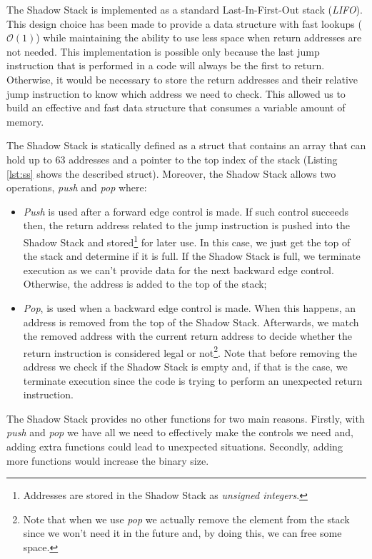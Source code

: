 The Shadow Stack is implemented as a standard Last-In-First-Out stack (\textit{LIFO}).
This design choice has been made to provide a data structure with fast lookups ($\mathcal{O}
(1)$) while maintaining the ability to use less space when return addresses are
not needed. This implementation is possible only because the last jump instruction
that is performed in a code will always be the first to return. Otherwise, it would
be necessary to store the return addresses and their relative jump instruction to
know which address we need to check. This allowed us to build an effective and
fast data structure that consumes a variable amount of memory.

The Shadow Stack is statically defined as a struct that contains an array that
can hold up to $63$ addresses and a pointer to the top index of the stack (Listing
\ref{lst:ss} shows the described struct). Moreover, the Shadow Stack allows two
operations, \textit{push} and \textit{pop} where:
\begin{itemize}
  \item \textit{Push} is used after a forward edge control is made. If such control
    succeeds then, the return address related to the jump instruction is pushed
    into the Shadow Stack and stored\footnote{Addresses are stored in the Shadow
    Stack as \textit{unsigned integers}.} for later use. In this case, we just get
    the top of the stack and determine if it is full. If the Shadow Stack is
    full, we terminate execution as we can't provide data for the next backward edge
    control. Otherwise, the address is added to the top of the stack;

  \item \textit{Pop}, is used when a backward edge control is made. When this
    happens, an address is removed from the top of the Shadow Stack. Afterwards,
    we match the removed address with the current return address to decide whether
    the return instruction is considered legal or not\footnote{Note that when we
    use \textit{pop} we actually remove the element from the stack since we won't
    need it in the future and, by doing this, we can free some space.}. Note that
    before removing the address we check if the Shadow Stack is empty and, if
    that is the case, we terminate execution since the code is trying to perform
    an unexpected return instruction.
\end{itemize}

The Shadow Stack provides no other functions for two main reasons. Firstly, with
\textit{push} and \textit{pop} we have all we need to effectively make the controls
we need and, adding extra functions could lead to unexpected situations. Secondly,
adding more functions would increase the binary size.

